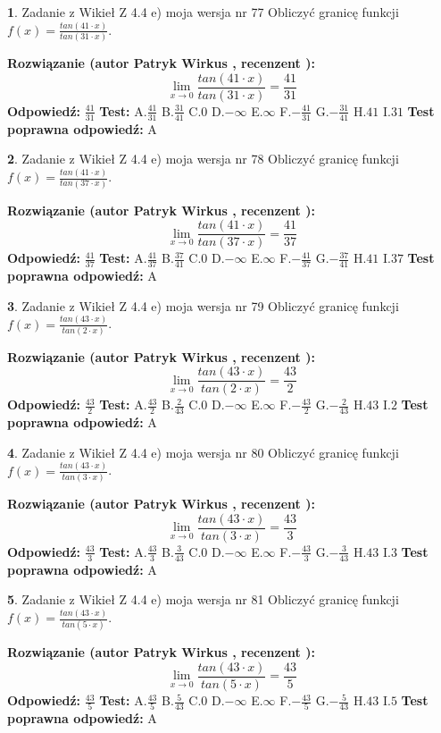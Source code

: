\documentclass[12pt, a4paper]{article}
\theoremstyle{definition} %
\newtheorem{zad}{}
\newcommand{\zadStart}[1]{\begin{zad}#1\newline}
\newcommand{\zadStop}{\end{zad}}
\newcommand{\rozwStart}[2]{\noindent \textbf{Rozwiązanie (autor #1 , recenzent #2): }\newline}
\newcommand{\rozwStop}{\newline}
\newcommand{\odpStart}{\noindent \textbf{Odpowiedź:}\newline}
\newcommand{\odpStop}{\newline}
\newcommand{\testStart}{\noindent \textbf{Test:}\newline}
\newcommand{\testStop}{\newline}
\newcommand{\kluczStart}{\noindent \textbf{Test poprawna odpowiedź:}\newline}
\newcommand{\kluczStop}{\newline}
\begin{document}
\zadStart{Zadanie z Wikieł Z 4.4 e) moja wersja nr 77}
Obliczyć granicę funkcji $f(x)=\frac{tan(41\cdot x)}{tan(31\cdot x)}$.
\zadStop
\rozwStart{Patryk Wirkus}{}
$$\lim\limits_{x\to 0}\frac{tan(41\cdot x)}{tan(31\cdot x)}=
\frac{41}{31}$$
\rozwStop
\odpStart
$\frac{41}{31}$
\odpStop
\testStart
A.$\frac{41}{31}$
B.$\frac{31}{41}$
C.$0$
D.$-\infty$
E.$\infty$
F.$-\frac{41}{31}$
G.$-\frac{31}{41}$
H.$41$
I.$31$
\testStop
\kluczStart
A
\kluczStop



\zadStart{Zadanie z Wikieł Z 4.4 e) moja wersja nr 78}
Obliczyć granicę funkcji $f(x)=\frac{tan(41\cdot x)}{tan(37\cdot x)}$.
\zadStop
\rozwStart{Patryk Wirkus}{}
$$\lim\limits_{x\to 0}\frac{tan(41\cdot x)}{tan(37\cdot x)}=
\frac{41}{37}$$
\rozwStop
\odpStart
$\frac{41}{37}$
\odpStop
\testStart
A.$\frac{41}{37}$
B.$\frac{37}{41}$
C.$0$
D.$-\infty$
E.$\infty$
F.$-\frac{41}{37}$
G.$-\frac{37}{41}$
H.$41$
I.$37$
\testStop
\kluczStart
A
\kluczStop



\zadStart{Zadanie z Wikieł Z 4.4 e) moja wersja nr 79}
Obliczyć granicę funkcji $f(x)=\frac{tan(43\cdot x)}{tan(2\cdot x)}$.
\zadStop
\rozwStart{Patryk Wirkus}{}
$$\lim\limits_{x\to 0}\frac{tan(43\cdot x)}{tan(2\cdot x)}=
\frac{43}{2}$$
\rozwStop
\odpStart
$\frac{43}{2}$
\odpStop
\testStart
A.$\frac{43}{2}$
B.$\frac{2}{43}$
C.$0$
D.$-\infty$
E.$\infty$
F.$-\frac{43}{2}$
G.$-\frac{2}{43}$
H.$43$
I.$2$
\testStop
\kluczStart
A
\kluczStop



\zadStart{Zadanie z Wikieł Z 4.4 e) moja wersja nr 80}
Obliczyć granicę funkcji $f(x)=\frac{tan(43\cdot x)}{tan(3\cdot x)}$.
\zadStop
\rozwStart{Patryk Wirkus}{}
$$\lim\limits_{x\to 0}\frac{tan(43\cdot x)}{tan(3\cdot x)}=
\frac{43}{3}$$
\rozwStop
\odpStart
$\frac{43}{3}$
\odpStop
\testStart
A.$\frac{43}{3}$
B.$\frac{3}{43}$
C.$0$
D.$-\infty$
E.$\infty$
F.$-\frac{43}{3}$
G.$-\frac{3}{43}$
H.$43$
I.$3$
\testStop
\kluczStart
A
\kluczStop



\zadStart{Zadanie z Wikieł Z 4.4 e) moja wersja nr 81}
Obliczyć granicę funkcji $f(x)=\frac{tan(43\cdot x)}{tan(5\cdot x)}$.
\zadStop
\rozwStart{Patryk Wirkus}{}
$$\lim\limits_{x\to 0}\frac{tan(43\cdot x)}{tan(5\cdot x)}=
\frac{43}{5}$$
\rozwStop
\odpStart
$\frac{43}{5}$
\odpStop
\testStart
A.$\frac{43}{5}$
B.$\frac{5}{43}$
C.$0$
D.$-\infty$
E.$\infty$
F.$-\frac{43}{5}$
G.$-\frac{5}{43}$
H.$43$
I.$5$
\testStop
\kluczStart
A
\kluczStop
\end{document}
